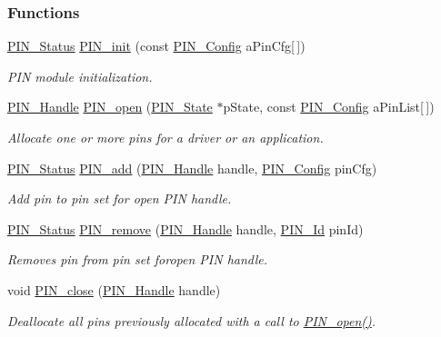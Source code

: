 \subsubsection*{Functions}
\begin{DoxyCompactItemize}
\item 
\hyperlink{_p_i_n_8h_abe0ad59bbf09e51fe37195a5e70b23f6}{P\+I\+N\+\_\+\+Status} \hyperlink{_p_i_n_8h_a0de1df98a14e6e13b16db414e54472ef}{P\+I\+N\+\_\+init} (const \hyperlink{_p_i_n_8h_ae427b7d2925f9b0f3145e455cfdb5841}{P\+I\+N\+\_\+\+Config} a\+Pin\+Cfg\mbox{[}$\,$\mbox{]})
\begin{DoxyCompactList}\small\item\em P\+I\+N module initialization. \end{DoxyCompactList}\item 
\hyperlink{_p_i_n_8h_afb2de52b054638f63c39df1f30a0d88d}{P\+I\+N\+\_\+\+Handle} \hyperlink{_p_i_n_8h_a731c5bb641ffeb064579432adfc8dba0}{P\+I\+N\+\_\+open} (\hyperlink{_p_i_n_8h_a36ef69d50df6baa6973482669c24a522}{P\+I\+N\+\_\+\+State} $\ast$p\+State, const \hyperlink{_p_i_n_8h_ae427b7d2925f9b0f3145e455cfdb5841}{P\+I\+N\+\_\+\+Config} a\+Pin\+List\mbox{[}$\,$\mbox{]})
\begin{DoxyCompactList}\small\item\em Allocate one or more pins for a driver or an application. \end{DoxyCompactList}\item 
\hyperlink{_p_i_n_8h_abe0ad59bbf09e51fe37195a5e70b23f6}{P\+I\+N\+\_\+\+Status} \hyperlink{_p_i_n_8h_ae96b7cc445336d52f8f6db762ff80156}{P\+I\+N\+\_\+add} (\hyperlink{_p_i_n_8h_afb2de52b054638f63c39df1f30a0d88d}{P\+I\+N\+\_\+\+Handle} handle, \hyperlink{_p_i_n_8h_ae427b7d2925f9b0f3145e455cfdb5841}{P\+I\+N\+\_\+\+Config} pin\+Cfg)
\begin{DoxyCompactList}\small\item\em Add pin to pin set for open P\+I\+N handle. \end{DoxyCompactList}\item 
\hyperlink{_p_i_n_8h_abe0ad59bbf09e51fe37195a5e70b23f6}{P\+I\+N\+\_\+\+Status} \hyperlink{_p_i_n_8h_a7edb10913792e741318ef339d5c7ef13}{P\+I\+N\+\_\+remove} (\hyperlink{_p_i_n_8h_afb2de52b054638f63c39df1f30a0d88d}{P\+I\+N\+\_\+\+Handle} handle, \hyperlink{_p_i_n_8h_a9ae8197f460bb76ea09a84f47d09921f}{P\+I\+N\+\_\+\+Id} pin\+Id)
\begin{DoxyCompactList}\small\item\em Removes pin from pin set foropen P\+I\+N handle. \end{DoxyCompactList}\item 
void \hyperlink{_p_i_n_8h_a877e82b9c5333a122cc408e103feba68}{P\+I\+N\+\_\+close} (\hyperlink{_p_i_n_8h_afb2de52b054638f63c39df1f30a0d88d}{P\+I\+N\+\_\+\+Handle} handle)
\begin{DoxyCompactList}\small\item\em Deallocate all pins previously allocated with a call to \hyperlink{_p_i_n_8h_a731c5bb641ffeb064579432adfc8dba0}{P\+I\+N\+\_\+open()}. \end{DoxyCompactList}\end{DoxyCompactItemize}
